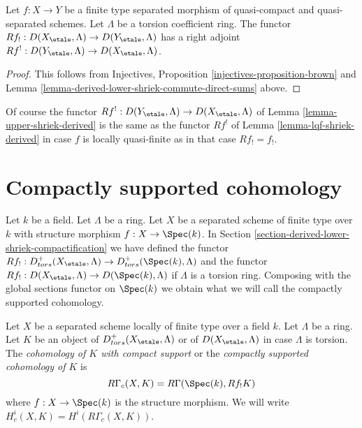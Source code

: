 \begin{lemma}
\label{lemma-upper-shriek-derived}
Let $f : X \to Y$ be a finite type separated morphism of quasi-compact
and quasi-separated schemes. Let $\Lambda$ be a torsion coefficient ring.
The functor
$Rf_! : D(X_\etale, \Lambda) \to D(Y_\etale, \Lambda)$
has a right adjoint
$Rf^! : D(Y_\etale, \Lambda) \to D(X_\etale, \Lambda)$.
\end{lemma}

\begin{proof}
This follows from
Injectives, Proposition \ref{injectives-proposition-brown}
and Lemma \ref{lemma-derived-lower-shriek-commute-direct-sums} above.
\end{proof}

\noindent
Of course the functor $Rf^! : D(Y_\etale, \Lambda) \to D(X_\etale, \Lambda)$
of Lemma \ref{lemma-upper-shriek-derived} is the same as the functor
$Rf^!$ of Lemma \ref{lemma-lqf-shriek-derived} in case $f$ is locally
quasi-finite as in that case $Rf_! = f_!$.




\section{Compactly supported cohomology}
\label{section-compactly-supported-cohomology}

\noindent
Let $k$ be a field. Let $\Lambda$ be a ring. Let $X$ be a separated scheme
of finite type over $k$ with structure morphism $f : X \to \Spec(k)$.
In Section \ref{section-derived-lower-shriek-compactification}
we have defined the functor
$Rf_! : D^+_{tors}(X_\etale, \Lambda) \to D^+_{tors}(\Spec(k), \Lambda)$
and the functor $Rf_! : D(X_\etale, \Lambda) \to D(\Spec(k), \Lambda)$
if $\Lambda$ is a torsion ring. Composing with the global sections functor
on $\Spec(k)$ we obtain what we will call the compactly supported cohomology.

\begin{definition}
\label{definition-cohomology-compact-support}
Let $X$ be a separated scheme locally of finite type over a field $k$.
Let $\Lambda$ be a ring. Let $K$ be an object of
$D^+_{tors}(X_\etale, \Lambda)$
or of $D(X_\etale, \Lambda)$ in case $\Lambda$ is torsion.
The {\it cohomology of $K$ with compact support} or the
{\it compactly supported cohomology of $K$} is
$$
R\Gamma_c(X, K) = R\Gamma(\Spec(k), Rf_!K)
$$
where $f : X \to \Spec(k)$ is the structure morphism. We will
write  $H^i_c(X, K) = H^i(R\Gamma_c(X, K))$.
\end{definition}


